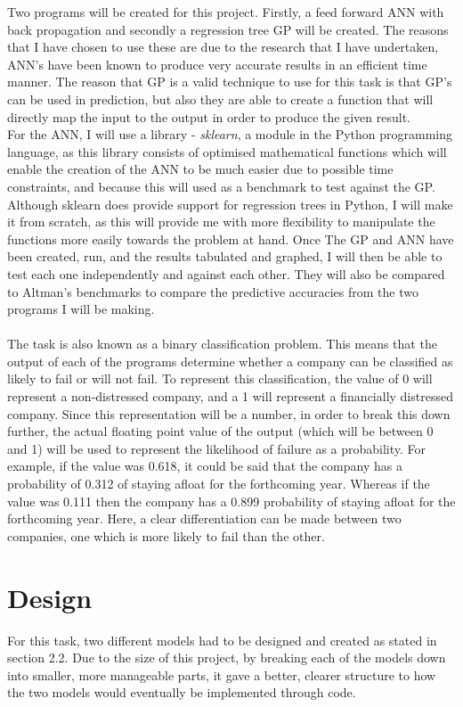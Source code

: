 \documentclass[11pt]{article}
\begin{document}
Two programs will be created for this project. Firstly, a feed forward ANN with back propagation and secondly a regression tree GP will be created. The reasons that I have chosen to use these are due to the research that I have undertaken, ANN's have been known to produce very accurate results in an efficient time manner. The reason that GP is a valid technique to use for this task is that GP's can be used in prediction, but also they are able to create a function that will directly map the input to the output in order to produce the given result. \\
For the ANN, I will use a library - \textit{sklearn}, a module in the Python programming language,  as this library consists of optimised mathematical functions which will enable the creation of the ANN to be much easier due to possible time constraints, and because this will used as a benchmark to test against the GP. Although sklearn does provide support for regression trees in Python, I will make it from scratch, as this will provide me with more flexibility to manipulate the functions more easily towards the problem at hand. 
Once The GP and ANN have been created, run, and the results tabulated and graphed, I will then be able to test each one independently and against each other. They will also be compared to Altman's benchmarks to compare the predictive accuracies from the two programs I will be making. \\\\
The task is also known as a binary classification problem. This means that the output of each of the programs determine whether a company can be classified as likely to fail or will not fail. To represent this classification, the value of 0 will represent a non-distressed company, and a 1 will represent a financially distressed company.
Since this representation will be a number, in order to break this down further, the actual floating point value of the output (which will be between 0 and 1) will be used  to represent the likelihood of failure as a probability. For example, if the value was 0.618, it could be said that the company has a probability of 0.312 of staying afloat for the forthcoming year. Whereas if the value was 0.111 then the company has a 0.899 probability of staying afloat for the forthcoming year. Here, a clear differentiation can be made between two companies, one which is more likely to fail than the other.


\newpage
\section{Design}
For this task, two different models had to be designed and created as stated in section 2.2. Due to the size of this project, by breaking each of the models down into smaller, more manageable parts, it gave a better, clearer structure to how the two models would eventually be implemented through code. 
\end{document}
